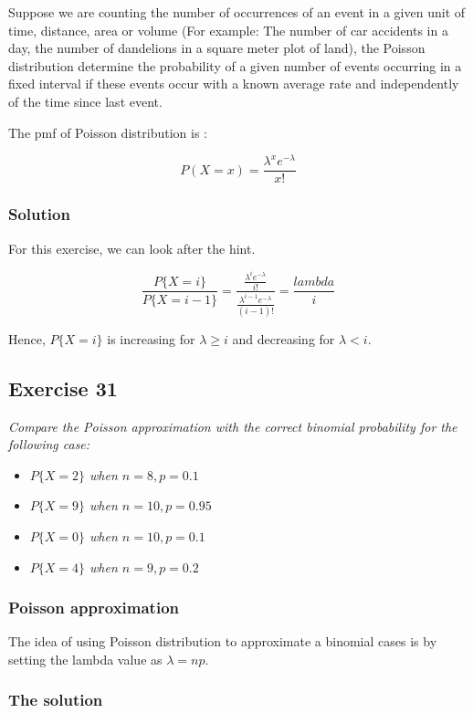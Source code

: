 \documentclass[12pt,a4paper]{article}
\begin{document}
Suppose we are counting the number of occurrences of an event in a given unit of time, distance, area or volume (For example: The number of car accidents in a day, the number of dandelions in a square meter plot of land), the Poisson distribution determine the probability of a given number of events occurring in a fixed interval if these events occur with a known average rate and independently of the time since last event.

The pmf of Poisson distribution is :

\[
P(X = x) = \frac{\lambda^{x} e^{-\lambda}}{x!}
\]


\subsubsection{Solution}

For this exercise, we can look after the hint.

\[
\frac{P\{X = i\}}{P\{X = i-1\}} = \frac{\frac{\lambda^{i} e^{-\lambda}}{i!}}{\frac{\lambda^{i-1} e^{-\lambda}}{(i-1)!}} = \frac{lambda}{i}
\]

Hence, $P\{X=i\}$ is increasing for $\lambda \geq i$ and decreasing for $\lambda < i$.


\subsection{Exercise 31}

\textit{Compare the Poisson approximation with the correct binomial probability for the following case:}

\begin{itemize}
	\item \textit{$P\{X=2\}$ when $n=8, p=0.1$}
	\item \textit{$P\{X=9\}$ when $n=10, p=0.95$}
	\item \textit{$P\{X=0\}$ when $n=10, p=0.1$}
	\item \textit{$P\{X=4\}$ when $n=9, p=0.2$}
\end{itemize}

\subsubsection{Poisson approximation}

The idea of using Poisson distribution to approximate a binomial cases is by setting the lambda value as $\lambda = np$.

\subsubsection{The solution}
\end{document}
